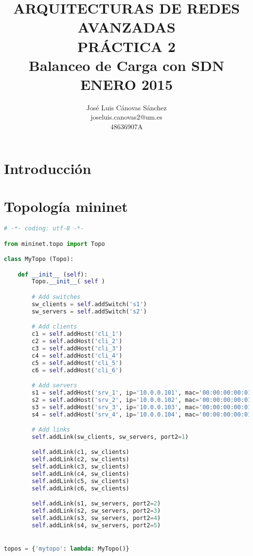 \documentclass{article}
\author{José Luis Cánovas Sánchez\\joseluis.canovas2@um.es\\48636907A}
\title{ARQUITECTURAS DE REDES AVANZADAS\\PRÁCTICA 2\\Balanceo de Carga con SDN\\ ENERO 2015}
\date{}
\begin{document}
\maketitle

\begin{abstract}

\end{abstract}

\tableofcontents

\section{Introducción}

\section{Topología mininet}


\begin{lstlisting}[language=Python]
# -*- coding: utf-8 -*-

from mininet.topo import Topo

class MyTopo (Topo):

    def __init__ (self):
        Topo.__init__( self )

        # Add switches
        sw_clients = self.addSwitch('s1')
        sw_servers = self.addSwitch('s2')

        # Add clients
        c1 = self.addHost('cli_1')
        c2 = self.addHost('cli_2')
        c3 = self.addHost('cli_3')
        c4 = self.addHost('cli_4')
        c5 = self.addHost('cli_5')
        c6 = self.addHost('cli_6')

        # Add servers
        s1 = self.addHost('srv_1', ip='10.0.0.101', mac='00:00:00:00:01:01')
        s2 = self.addHost('srv_2', ip='10.0.0.102', mac='00:00:00:00:01:02')
        s3 = self.addHost('srv_3', ip='10.0.0.103', mac='00:00:00:00:01:03')
        s4 = self.addHost('srv_4', ip='10.0.0.104', mac='00:00:00:00:01:04')

        # Add links
        self.addLink(sw_clients, sw_servers, port2=1)

        self.addLink(c1, sw_clients)
        self.addLink(c2, sw_clients)
        self.addLink(c3, sw_clients)
        self.addLink(c4, sw_clients)
        self.addLink(c5, sw_clients)
        self.addLink(c6, sw_clients)

        self.addLink(s1, sw_servers, port2=2)
        self.addLink(s2, sw_servers, port2=3)
        self.addLink(s3, sw_servers, port2=4)
        self.addLink(s4, sw_servers, port2=5)


topos = {'mytopo': lambda: MyTopo()}
\end{lstlisting}
\end{document}

